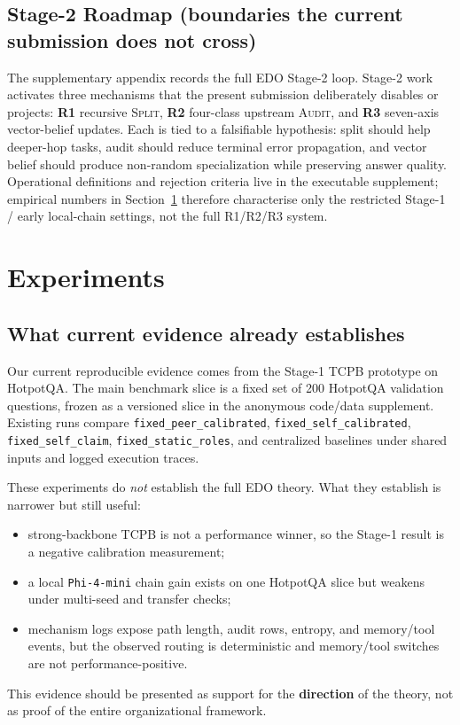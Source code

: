 \documentclass[11pt]{article}
\begin{document}
\subsection{Stage-2 Roadmap (boundaries the current submission does not cross)}
\label{sec:stage2-roadmap}

The supplementary appendix records the full EDO Stage-2 loop. Stage-2 work activates three mechanisms that the present submission deliberately disables or projects: \textbf{R1} recursive \textsc{Split}, \textbf{R2} four-class upstream \textsc{Audit}, and \textbf{R3} seven-axis vector-belief updates. Each is tied to a falsifiable hypothesis: split should help deeper-hop tasks, audit should reduce terminal error propagation, and vector belief should produce non-random specialization while preserving answer quality. Operational definitions and rejection criteria live in the executable supplement; empirical numbers in Section~\ref{sec:experiments} therefore characterise only the restricted Stage-1 / early local-chain settings, not the full R1/R2/R3 system.

\section{Experiments}
\label{sec:experiments}

\subsection{What current evidence already establishes}

Our current reproducible evidence comes from the Stage-1 TCPB prototype on HotpotQA. The main benchmark slice is a fixed set of 200 HotpotQA validation questions, frozen as a versioned slice in the anonymous code/data supplement. Existing runs compare \texttt{fixed\_peer\_calibrated}, \texttt{fixed\_self\_calibrated}, \texttt{fixed\_self\_claim}, \texttt{fixed\_static\_roles}, and centralized baselines under shared inputs and logged execution traces.

These experiments do \emph{not} establish the full EDO theory. What they establish is narrower but still useful:
\begin{itemize}
  \item strong-backbone TCPB is not a performance winner, so the Stage-1 result is a negative calibration measurement;
  \item a local \texttt{Phi-4-mini} chain gain exists on one HotpotQA slice but weakens under multi-seed and transfer checks;
  \item mechanism logs expose path length, audit rows, entropy, and memory/tool events, but the observed routing is deterministic and memory/tool switches are not performance-positive.
\end{itemize}
This evidence should be presented as support for the \textbf{direction} of the theory, not as proof of the entire organizational framework.
\end{document}
